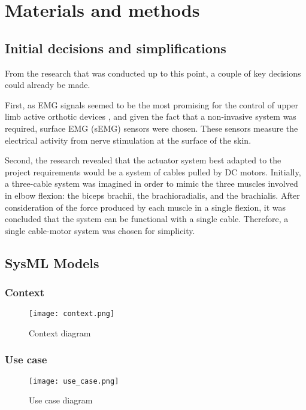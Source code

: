 \chapter{Materials and methods}

\section{Initial decisions and simplifications}
From the research that was conducted up to this point, a couple of key decisions 
could already be made.  

First, as EMG signals seemed to be the most promising for the control of upper 
limb active orthotic devices \cite{dos_santos_signals_2023}, and given the fact 
that a non-invasive system was required, surface EMG (sEMG) sensors were chosen. 
These sensors measure the electrical activity from nerve stimulation at the 
surface of the skin.  

Second, the research revealed that the actuator system best adapted to the 
project requirements would be a system of cables pulled by DC motors. Initially, 
a three-cable system was imagined in order to mimic the three muscles involved 
in elbow flexion: the biceps brachii, the brachioradialis, and the brachialis. 
After consideration of the force produced by each muscle in a single flexion, 
it was concluded that the system can be functional with a single cable. 
Therefore, a single cable-motor system was chosen for simplicity.  

\section{SysML Models}
\subsection{Context}
\begin{figure}[htbp]
  \centering
  \texttt{[image: context.png]}
  \caption{Context diagram}
  \label{fig:context_diagram}
\end{figure}
\FloatBarrier
\subsection{Use case}
\begin{figure}[htbp]
  \centering
  \texttt{[image: use\_case.png]}
  \caption{Use case diagram}
  \label{fig:use_case_diagram}
\end{figure}
\FloatBarrier
